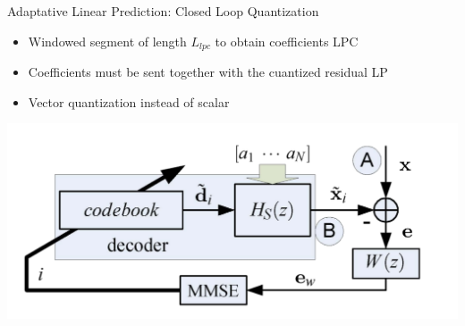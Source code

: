 \documentclass[10pt]{beamer}
\begin{document}
\begin{frame}{Adaptative Linear Prediction: Closed Loop Quantization }
\begin{itemize}
  \item Windowed segment of length $L_{lpc}$ to obtain coefficients LPC
  \item Coefficients must be sent together with the cuantized residual LP
  \item Vector quantization instead of scalar
\end{itemize}
\centering
\includegraphics[width=0.8\linewidth]{./img/esquema_simple_r.png}
\end{frame}

\end{document}
